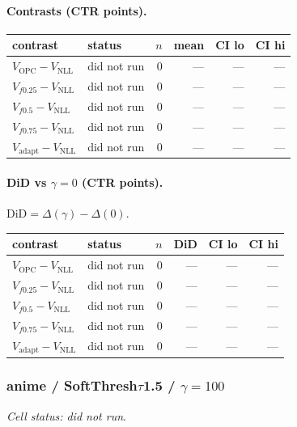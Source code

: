\documentclass[10pt,a4paper]{article}
\begin{document}
\paragraph{Contrasts (CTR points).}
{\centering\small\begin{tabular}{llrrrr}
\toprule contrast & status & $n$ & mean & CI lo & CI hi \\
\midrule
$V_{\mathrm{OPC}}-V_{\mathrm{NLL}}$ & did not run & 0 & --- & --- & --- \\
$V_{f0.25}-V_{\mathrm{NLL}}$ & did not run & 0 & --- & --- & --- \\
$V_{f0.5}-V_{\mathrm{NLL}}$ & did not run & 0 & --- & --- & --- \\
$V_{f0.75}-V_{\mathrm{NLL}}$ & did not run & 0 & --- & --- & --- \\
$V_{\mathrm{adapt}}-V_{\mathrm{NLL}}$ & did not run & 0 & --- & --- & --- \\
\bottomrule\end{tabular}\par}
\paragraph{DiD vs $\gamma=0$ (CTR points).} $\mathrm{DiD}=\Delta(\gamma)-\Delta(0)$.
{\centering\small\begin{tabular}{llrrrr}
\toprule contrast & status & $n$ & DiD & CI lo & CI hi \\
\midrule
$V_{\mathrm{OPC}}-V_{\mathrm{NLL}}$ & did not run & 0 & --- & --- & --- \\
$V_{f0.25}-V_{\mathrm{NLL}}$ & did not run & 0 & --- & --- & --- \\
$V_{f0.5}-V_{\mathrm{NLL}}$ & did not run & 0 & --- & --- & --- \\
$V_{f0.75}-V_{\mathrm{NLL}}$ & did not run & 0 & --- & --- & --- \\
$V_{\mathrm{adapt}}-V_{\mathrm{NLL}}$ & did not run & 0 & --- & --- & --- \\
\bottomrule\end{tabular}\par}
\bigskip
\subsubsection{anime / SoftThresh$\tau$1.5 / $\gamma=100$}
\emph{Cell status: did not run}.
\end{document}
